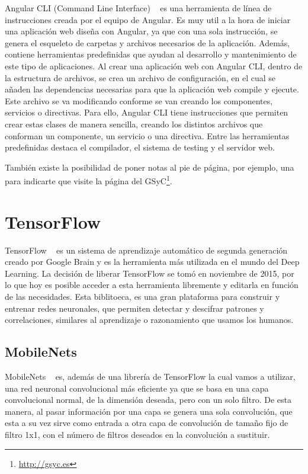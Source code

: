 \documentclass[a4paper, 12pt]{book}
\begin{document}
Angular CLI (Command Line Interface) ~\cite{articulobayes} es una herramienta de línea de instrucciones creada por el equipo de Angular. Es muy util a la hora de iniciar una aplicación web diseña con Angular, ya que con una sola instrucción, se genera el esqueleto de carpetas y archivos necesarios de la aplicación. Además, contiene herramientas predefinidas que ayudan al desarrollo y mantenimiento de este tipo de aplicaciones. Al crear una aplicación web con Angular CLI, dentro de la estructura de archivos, se crea un archivo de configuración, en el cual se añaden las dependencias necesarias para que la aplicación web compile y ejecute. Este archivo se va modificando conforme se van creando los componentes, servicios o directivas. Para ello, Angular CLI tiene instrucciones que permiten crear estas clases de manera sencilla, creando los distintos archivos que conforman un componente, un servicio o una directiva. Entre las herramientas predefinidas destaca el compilador, el sistema de testing y el servidor web.


También existe la posibilidad de poner notas al pie de página, por ejemplo, una para indicarte que visite la página del GSyC\footnote{\url{http://gsyc.es}}.

\section{TensorFlow} 
\label{sec:tensorflow}

TensorFlow ~\cite{tensorflow} es un sistema de aprendizaje automático de segunda generación creado por Google Brain y es la herramienta más utilizada en el mundo del Deep Learning. La decisión de liberar TensorFlow se tomó en noviembre de 2015, por lo que hoy es posible acceder a esta herramienta libremente y editarla en función de las necesidades. Esta biblitoeca, es una gran plataforma para construir y entrenar redes neuronales, que permiten detectar y descifrar patrones y correlaciones, similares al aprendizaje o razonamiento que usamos los humanos. 

\subsection{MobileNets} 
\label{sec:mobilenets}

MobileNets ~\cite{mobilenets} es, además de una librería de TensorFlow la cual vamos a utilizar, una red neuronal convolucional más eficiente ya que se basa en una capa convolucional normal, de la dimensión deseada, pero con un solo filtro. De esta manera, al pasar información por una capa se genera una sola convolución, que esta a su vez sirve como entrada a otra capa de convolución de tamaño fijo de filtro 1x1, con el número de filtros deseados en la convolución a sustituir.
\end{document}

